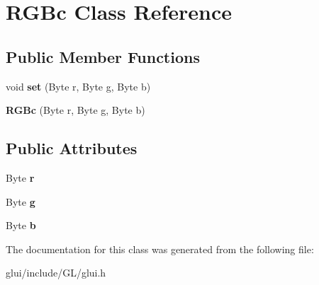\hypertarget{classRGBc}{\section{R\-G\-Bc Class Reference}
\label{classRGBc}
}
\subsection*{Public Member Functions}
\begin{DoxyCompactItemize}
\item 
\hypertarget{classRGBc_a60b887d5881c06dcb2ba0d2e75e01855}{void {\bfseries set} (Byte r, Byte g, Byte b)}\label{classRGBc_a60b887d5881c06dcb2ba0d2e75e01855}

\item 
\hypertarget{classRGBc_aaa6e6a4e21d3112836924657ea40cb84}{{\bfseries R\-G\-Bc} (Byte r, Byte g, Byte b)}\label{classRGBc_aaa6e6a4e21d3112836924657ea40cb84}

\end{DoxyCompactItemize}
\subsection*{Public Attributes}
\begin{DoxyCompactItemize}
\item 
\hypertarget{classRGBc_a924706b7ae3839bd89d84a41a38ac86a}{Byte {\bfseries r}}\label{classRGBc_a924706b7ae3839bd89d84a41a38ac86a}

\item 
\hypertarget{classRGBc_a0b4fc208f3eb1d14adbd67a0d7c72843}{Byte {\bfseries g}}\label{classRGBc_a0b4fc208f3eb1d14adbd67a0d7c72843}

\item 
\hypertarget{classRGBc_a587697e813f12fadbaafea78450dce93}{Byte {\bfseries b}}\label{classRGBc_a587697e813f12fadbaafea78450dce93}

\end{DoxyCompactItemize}


The documentation for this class was generated from the following file\-:\begin{DoxyCompactItemize}
\item 
glui/include/\-G\-L/glui.\-h\end{DoxyCompactItemize}
